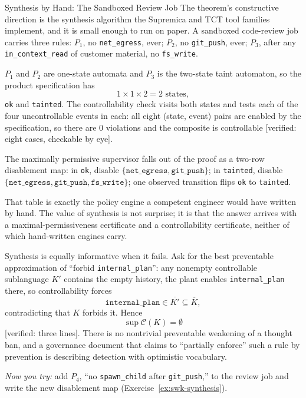 \documentclass[11pt,a4paper]{article}
\theoremstyle{definition}
\theoremstyle{remark}
\begin{document}
\begin{pdexample}{Synthesis by Hand: The Sandboxed Review Job}
\setlength{\parskip}{4pt plus 1pt}
The theorem's constructive direction is the synthesis algorithm the Supremica and TCT tool
families implement, and it is small enough to run on paper. A sandboxed code-review job
carries three rules: $P_1$, no \texttt{net\_egress}, ever; $P_2$, no \texttt{git\_push},
ever; $P_3$, after any \texttt{in\_context\_read} of customer material, no \texttt{fs\_write}.

$P_1$ and $P_2$ are one-state automata and $P_3$ is the two-state taint automaton, so the
product specification has
\[
1 \times 1 \times 2 = 2 \text{ states},
\]
\texttt{ok} and \texttt{tainted}.
The controllability check visits both states and tests each of the four uncontrollable events
in each: all eight (state, event) pairs are enabled by the specification, so there are $0$
violations and the composite is controllable [verified: eight cases, checkable by eye].

The
maximally permissive supervisor falls out of the proof as a two-row disablement map:
in \texttt{ok}, disable $\{\texttt{net\_egress}, \texttt{git\_push}\}$; in \texttt{tainted},
disable $\{\texttt{net\_egress}, \texttt{git\_push}, \texttt{fs\_write}\}$; one observed
transition flips \texttt{ok} to \texttt{tainted}.

That table is exactly the policy engine a
competent engineer would have written by hand. The value of synthesis is not surprise; it is
that the answer arrives with a maximal-permissiveness certificate and a controllability
certificate, neither of which hand-written engines carry.

Synthesis is equally informative when it fails. Ask for the best preventable approximation
of ``forbid \texttt{internal\_plan}'': any nonempty controllable sublanguage $K'$ contains the
empty history, the plant enables \texttt{internal\_plan} there, so controllability forces
\[
\texttt{internal\_plan} \in \overline{K'} \subseteq \overline{K},
\]
contradicting that $K$
forbids it. Hence
\[
\sup\mathcal{C}(K) = \emptyset
\]
[verified: three lines]. There is no
nontrivial preventable weakening of a thought ban, and a governance document that claims to
``partially enforce'' such a rule by prevention is describing detection with optimistic
vocabulary.

\emph{Now you try:} add $P_4$, ``no \texttt{spawn\_child} after
\texttt{git\_push},'' to the review job and write the new disablement map
(Exercise~\ref{ex:swk-synthesis}).
\end{pdexample}
\end{document}
